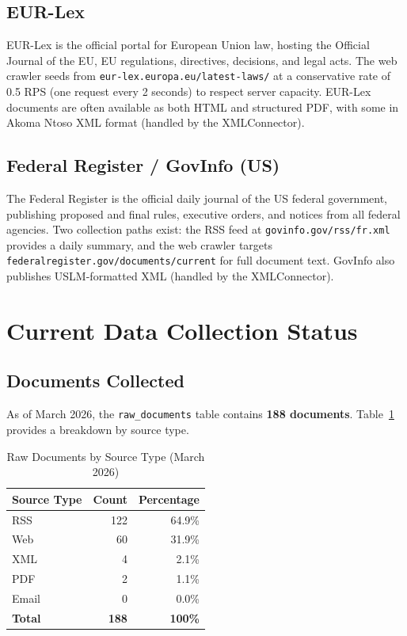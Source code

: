 \documentclass[12pt,a4paper]{article}
\begin{document}
\subsection{EUR-Lex}

EUR-Lex is the official portal for European Union law, hosting the Official Journal of the EU, EU regulations, directives, decisions, and legal acts. The web crawler seeds from \texttt{eur-lex.europa.eu/latest-laws/} at a conservative rate of 0.5 RPS (one request every 2 seconds) to respect server capacity. EUR-Lex documents are often available as both HTML and structured PDF, with some in Akoma Ntoso XML format (handled by the XMLConnector).

\subsection{Federal Register / GovInfo (US)}

The Federal Register is the official daily journal of the US federal government, publishing proposed and final rules, executive orders, and notices from all federal agencies. Two collection paths exist: the RSS feed at \texttt{govinfo.gov/rss/fr.xml} provides a daily summary, and the web crawler targets \texttt{federalregister.gov/documents/current} for full document text. GovInfo also publishes USLM-formatted XML (handled by the XMLConnector).

\section{Current Data Collection Status}

\subsection{Documents Collected}

As of March 2026, the \texttt{raw\_documents} table contains \textbf{188 documents}. Table~\ref{tab:datacounts} provides a breakdown by source type.

\begin{table}[H]
\centering
\caption{Raw Documents by Source Type (March 2026)}\label{tab:datacounts}
\begin{tabular}{@{}l r r@{}}
\toprule
\textbf{Source Type} & \textbf{Count} & \textbf{Percentage} \\
\midrule
RSS   & 122 & 64.9\% \\
Web   & 60  & 31.9\% \\
XML   & 4   & 2.1\%  \\
PDF   & 2   & 1.1\%  \\
Email & 0   & 0.0\%  \\
\midrule
\textbf{Total} & \textbf{188} & \textbf{100\%} \\
\bottomrule
\end{tabular}
\end{table}
\end{document}
